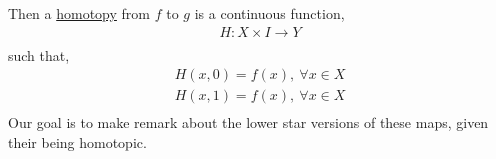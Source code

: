 \begin{enumerate}
            Then a \underline{homotopy} from $f$ to $g$ is a continuous function,
            \begin{align*}
                H: X\times I\rightarrow Y\\
            \end{align*}
            such that,
            \begin{align*}
                H(x,0)=f(x),\ \forall x\in X\\
                H(x,1)=f(x),\ \forall x\in X\\
            \end{align*}
            Our goal is to make remark about the lower star versions of these maps, given their being homotopic.
    \end{enumerate}
